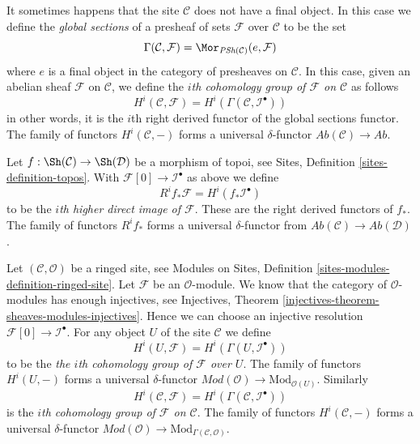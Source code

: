 \medskip\noindent
It sometimes happens that
the site $\mathcal{C}$ does not have a final object. In this
case we define the {\it global sections} of a presheaf
of sets $\mathcal{F}$ over $\mathcal{C}$ to be the set
\begin{equation}
\label{equation-global-sections}
\Gamma(\mathcal{C}, \mathcal{F}) =
\Mor_{\textit{PSh}(\mathcal{C})}(e, \mathcal{F})
\end{equation}
where $e$ is a final object in the category of presheaves on $\mathcal{C}$.
In this case, given an abelian sheaf $\mathcal{F}$ on $\mathcal{C}$,
we define the {\it $i$th cohomology group of $\mathcal{F}$ on $\mathcal{C}$}
as follows
\begin{equation}
\label{equation-cohomology}
H^i(\mathcal{C}, \mathcal{F}) = H^i(\Gamma(\mathcal{C}, \mathcal{I}^\bullet))
\end{equation}
in other words, it is the $i$th right derived functor of the
global sections functor.
The family of functors $H^i(\mathcal{C}, -)$ forms a universal $\delta$-functor
$\textit{Ab}(\mathcal{C}) \to \textit{Ab}$.

\medskip\noindent
Let $f : \Sh(\mathcal{C}) \to \Sh(\mathcal{D})$ be a morphism of topoi, see
Sites, Definition \ref{sites-definition-topos}.
With $\mathcal{F}[0] \to \mathcal{I}^\bullet$ as above
we define
\begin{equation}
\label{equation-higher-direct-image}
R^if_*\mathcal{F} = H^i(f_*\mathcal{I}^\bullet)
\end{equation}
to be the {\it $i$th higher direct image of $\mathcal{F}$}.
These are the right derived functors of $f_*$.
The family of functors $R^if_*$ forms a universal $\delta$-functor
from $\textit{Ab}(\mathcal{C}) \to \textit{Ab}(\mathcal{D})$.

\medskip\noindent
Let $(\mathcal{C}, \mathcal{O})$ be a ringed site, see
Modules on Sites, Definition \ref{sites-modules-definition-ringed-site}.
Let $\mathcal{F}$ be an $\mathcal{O}$-module.
We know that the category of $\mathcal{O}$-modules
has enough injectives, see
Injectives, Theorem \ref{injectives-theorem-sheaves-modules-injectives}.
Hence we can choose an injective resolution
$\mathcal{F}[0] \to \mathcal{I}^\bullet$.
For any object $U$ of the site $\mathcal{C}$ we define
\begin{equation}
\label{equation-cohomology-object-site-modules}
H^i(U, \mathcal{F}) = H^i(\Gamma(U, \mathcal{I}^\bullet))
\end{equation}
to be the {\it the $i$th cohomology group of $\mathcal{F}$ over $U$}.
The family of functors $H^i(U, -)$ forms a universal $\delta$-functor
$\textit{Mod}(\mathcal{O}) \to \text{Mod}_{\mathcal{O}(U)}$. Similarly
\begin{equation}
\label{equation-cohomology-modules}
H^i(\mathcal{C}, \mathcal{F}) = H^i(\Gamma(\mathcal{C}, \mathcal{I}^\bullet))
\end{equation}
is the {\it $i$th cohomology group of $\mathcal{F}$ on $\mathcal{C}$}.
The family of functors $H^i(\mathcal{C}, -)$ forms a universal
$\delta$-functor
$\textit{Mod}(\mathcal{O}) \to \text{Mod}_{\Gamma(\mathcal{C}, \mathcal{O})}$.


